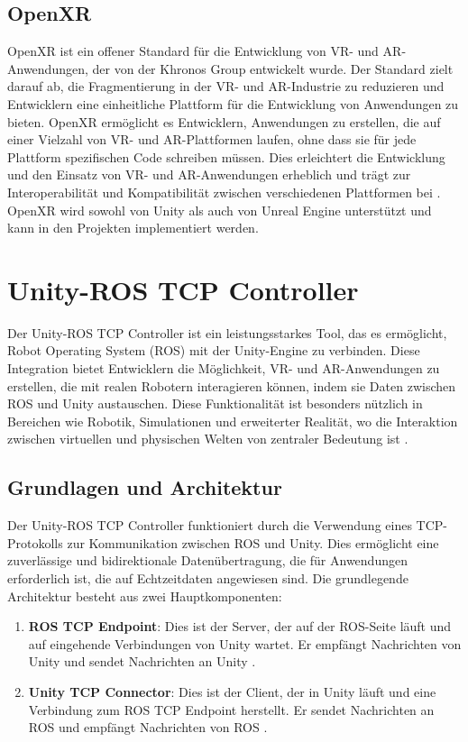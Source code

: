 \subsection{OpenXR}
OpenXR ist ein offener Standard für die Entwicklung von \ac{VR}- und \ac{AR}-Anwendungen, der von der Khronos Group entwickelt wurde. Der Standard zielt darauf ab, die Fragmentierung in der VR- und AR-Industrie zu reduzieren und Entwicklern eine einheitliche Plattform für die Entwicklung von Anwendungen zu bieten. OpenXR ermöglicht es Entwicklern, Anwendungen zu erstellen, die auf einer Vielzahl von \ac{VR}- und \ac{AR}-Plattformen laufen, ohne dass sie für jede Plattform spezifischen Code schreiben müssen. Dies erleichtert die Entwicklung und den Einsatz von \ac{VR}- und \ac{AR}-Anwendungen erheblich und trägt zur Interoperabilität und Kompatibilität zwischen verschiedenen Plattformen bei \cite{unityOpenXR2021}.
\\

\noindent
OpenXR wird sowohl von Unity als auch von Unreal Engine unterstützt und kann in den Projekten implementiert werden. 
\section{Unity-ROS TCP Controller}

Der Unity-ROS TCP Controller ist ein leistungsstarkes Tool, das es ermöglicht, Robot Operating System (ROS) mit der Unity-Engine zu verbinden. Diese Integration bietet Entwicklern die Möglichkeit, VR- und AR-Anwendungen zu erstellen, die mit realen Robotern interagieren können, indem sie Daten zwischen ROS und Unity austauschen. Diese Funktionalität ist besonders nützlich in Bereichen wie Robotik, Simulationen und erweiterter Realität, wo die Interaktion zwischen virtuellen und physischen Welten von zentraler Bedeutung ist \cite{ros_tcp_endpoint,unity_ros_tcp_connector}.

\subsection{Grundlagen und Architektur}

Der Unity-ROS TCP Controller funktioniert durch die Verwendung eines TCP-Protokolls zur Kommunikation zwischen ROS und Unity. Dies ermöglicht eine zuverlässige und bidirektionale Datenübertragung, die für Anwendungen erforderlich ist, die auf Echtzeitdaten angewiesen sind. Die grundlegende Architektur besteht aus zwei Hauptkomponenten:

\begin{enumerate}
    \item \textbf{ROS TCP Endpoint}: Dies ist der Server, der auf der ROS-Seite läuft und auf eingehende Verbindungen von Unity wartet. Er empfängt Nachrichten von Unity und sendet Nachrichten an Unity \cite{ros_tcp_endpoint}.
    \item \textbf{Unity TCP Connector}: Dies ist der Client, der in Unity läuft und eine Verbindung zum ROS TCP Endpoint herstellt. Er sendet Nachrichten an ROS und empfängt Nachrichten von ROS \cite{unity_ros_tcp_connector}.
\end{enumerate}

